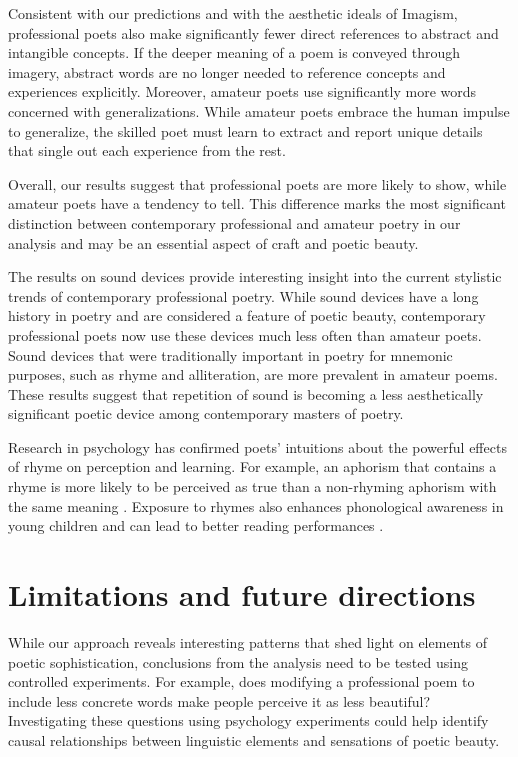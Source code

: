 \documentclass{book}
\begin{document}
Consistent with our predictions and with the aesthetic ideals of Imagism, professional poets also make significantly fewer direct references to abstract and intangible concepts. If the deeper meaning of a poem is conveyed through imagery, abstract words are no longer needed to reference concepts and experiences explicitly. Moreover, amateur poets use significantly more words concerned with generalizations. While amateur poets embrace the human impulse to generalize, the skilled poet must learn to extract and report unique details that single out each experience from the rest. 

Overall, our results suggest that professional poets are more likely to show, while amateur poets have a tendency to tell. This difference marks the most significant distinction between contemporary professional and amateur poetry in our analysis and may be an essential aspect of craft and poetic beauty.

The results on sound devices provide interesting insight into the current stylistic trends of contemporary professional poetry. While sound devices have a long history in poetry and are considered a feature of poetic beauty, contemporary professional poets now use these devices much less often than amateur poets. Sound devices that were traditionally important in poetry for mnemonic purposes, such as rhyme and alliteration, are more prevalent in amateur poems. These results suggest that repetition of sound is becoming a less aesthetically significant poetic device among contemporary masters of poetry.

Research in psychology has confirmed poets' intuitions about the powerful effects of rhyme on perception and learning. For example, an aphorism that contains a rhyme is more likely to be perceived as true than a non-rhyming aphorism with the same meaning \citep{aphorisms}. Exposure to rhymes also enhances phonological awareness in young children and can lead to better reading performances \citep{reading}.


\section{Limitations and future directions}

While our approach reveals interesting patterns that shed light on elements of poetic sophistication, conclusions from the analysis need to be tested using controlled experiments. For example, does modifying a professional poem to include less concrete words make people perceive it as less beautiful? Investigating these questions using psychology experiments could help identify causal relationships between linguistic elements and sensations of poetic beauty.
\end{document}
